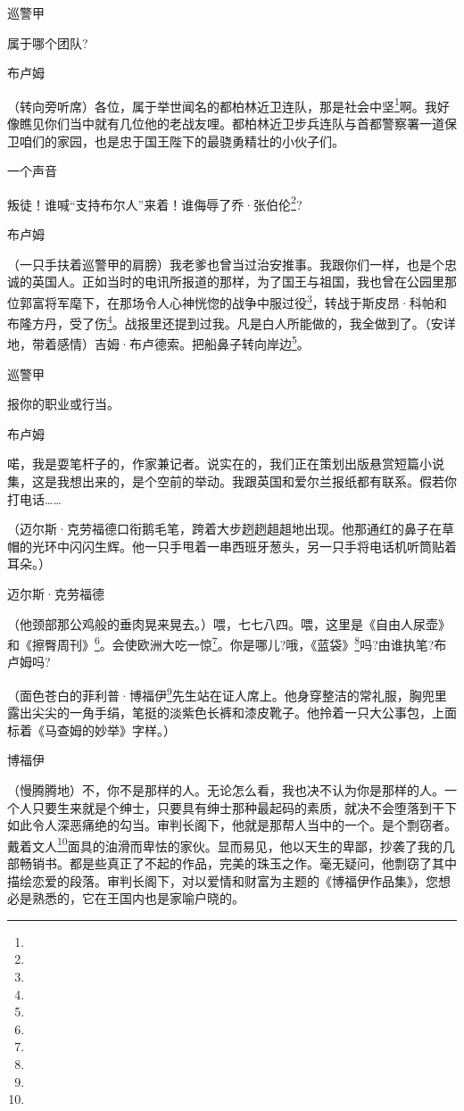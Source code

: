 \par 巡警甲
\par 属于哪个团队?
\par 布卢姆
\par （转向旁听席）各位，属于举世闻名的都柏林近卫连队，那是社会中坚\footnote{}啊。我好像瞧见你们当中就有几位他的老战友哩。都柏林近卫步兵连队与首都警察署一道保卫咱们的家园，也是忠于国王陛下的最骁勇精壮的小伙子们。
\par 一个声音
\par 叛徒！谁喊“支持布尔人”来着！谁侮辱了乔·张伯伦\footnote{}?
\par 布卢姆
\par （一只手扶着巡警甲的肩膀）我老爹也曾当过治安推事。我跟你们一样，也是个忠诚的英国人。正如当时的电讯所报道的那样，为了国王与祖国，我也曾在公园里那位郭富将军麾下，在那场令人心神恍惚的战争中服过役\footnote{}，转战于斯皮昂·科帕和布隆方丹，受了伤\footnote{}。战报里还提到过我。凡是白人所能做的，我全做到了。（安详地，带着感情）吉姆·布卢德索。把船鼻子转向岸边\footnote{}。
\par 巡警甲
\par 报你的职业或行当。
\par 布卢姆
\par 喏，我是耍笔杆子的，作家兼记者。说实在的，我们正在策划出版悬赏短篇小说集，这是我想出来的，是个空前的举动。我跟英国和爱尔兰报纸都有联系。假若你打电话……
\par （迈尔斯·克劳福德口衔鹅毛笔，跨着大步趔趔趄趄地出现。他那通红的鼻子在草帽的光环中闪闪生辉。他一只手甩着一串西班牙葱头，另一只手将电话机听筒贴着耳朵。）
\par 迈尔斯·克劳福德
\par （他颈部那公鸡般的垂肉晃来晃去。）喂，七七八四。喂，这里是《自由人尿壶》和《擦臀周刊》\footnote{}。会使欧洲大吃一惊\footnote{}。你是哪儿?哦，《蓝袋》\footnote{}吗?由谁执笔?布卢姆吗?
\par （面色苍白的菲利普·博福伊\footnote{}先生站在证人席上。他身穿整洁的常礼服，胸兜里露出尖尖的一角手绢，笔挺的淡紫色长裤和漆皮靴子。他拎着一只大公事包，上面标着《马查姆的妙举》字样。）
\par 博福伊
\par （慢腾腾地）不，你不是那样的人。无论怎么看，我也决不认为你是那样的人。一个人只要生来就是个绅士，只要具有绅士那种最起码的素质，就决不会堕落到干下如此令人深恶痛绝的勾当。审判长阁下，他就是那帮人当中的一个。是个剽窃者。戴着文人\footnote{}面具的油滑而卑怯的家伙。显而易见，他以天生的卑鄙，抄袭了我的几部畅销书。都是些真正了不起的作品，完美的珠玉之作。毫无疑问，他剽窃了其中描绘恋爱的段落。审判长阁下，对以爱情和财富为主题的《博福伊作品集》，您想必是熟悉的，它在王国内也是家喻户晓的。
